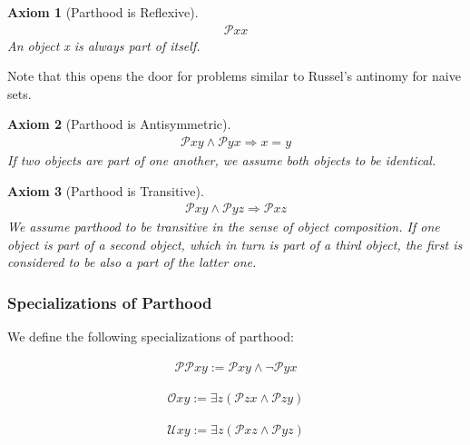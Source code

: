 \documentclass[runningheads,a4paper]{llncs}
\newtheorem{axiom}{Axiom}
\begin{document}
\begin{axiom}[Parthood is Reflexive]
\begin{align}
\mathcal{P}xx
\end{align}
An object x is always part of itself.
\end{axiom}
Note that this opens the door for problems similar to Russel's antinomy for naive sets. 
\begin{axiom}[Parthood is Antisymmetric]
\begin{align}
\mathcal{P}xy \wedge \mathcal{P}yx \Rightarrow x=y
\end{align}
If two objects are part of one another, we assume both objects to be identical.
\end{axiom}
\begin{axiom}[Parthood is Transitive]
\begin{align}
\mathcal{P}xy \wedge \mathcal{P}yz \Rightarrow \mathcal{P}xz
\end{align}
We assume parthood to be transitive in the sense of object composition.
If one object is part of  a second object, which in turn is part of a third object, the first is considered to be also a part of the latter one.
\end{axiom}

\subsubsection{Specializations of Parthood}
We define the following specializations of parthood:

\begin{definition}
\begin{align}
\mathcal{PP}xy := \mathcal{P}xy \wedge \neg \mathcal{P}yx
\end{align}
\end{definition}

\begin{definition}[Overlap]
\begin{align}
\mathcal{O}xy := \exists z (\mathcal{P}zx \wedge \mathcal{P}zy)
\end{align}
\end{definition}

\begin{definition}[Underlap]
\begin{align}
\mathcal{U}xy := \exists z (\mathcal{P}xz \wedge \mathcal{P}yz)
\end{align}
\end{definition}
\end{document}
